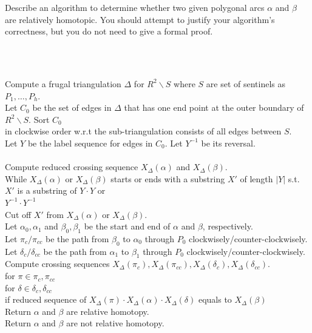 \documentclass[11pt]{article}
\begin{document}
Describe an algorithm to determine whether two given polygonal arcs \(\alpha\) and \(\beta\) are relatively homotopic. You should attempt to justify your algorithm’s correctness, but you do not need to give a formal proof.

\begin{solution}\(\)\par

  \begin{algo}
    \+
    \\  Compute a frugal triangulation \(\Delta\) for \(R^2\backslash S\) where \(S\) are set of sentinels as \(P_1,\dots,P_h\).
    \\  Let \(C_0\) be the set of edges in \(\Delta\) that has one end point at the outer boundary of \(R^2\backslash S\). Sort \(C_0\)
    \\  in clockwise order w.r.t the sub-triangulation consists of all edges between \(S\).
    \\  Let \(Y\) be the label sequence for edges in \(C_0\). Let \(Y^{-1}\) be its reversal.
    \\
    \\  Compute reduced crossing sequence \(X_\Delta(\alpha)\) and \(X_\Delta(\beta)\).
    \\  While \(X_\Delta(\alpha)\) or \(X_\Delta(\beta)\) starts or ends with a substring \(X'\) of length \(|Y|\) s.t. \(X'\) is a substring of \(Y\cdot Y\) or
    \\  \(Y^{-1}\cdot Y^{-1}\)\+
    \\    Cut off \(X'\) from \(X_\Delta(\alpha)\) or \(X_\Delta(\beta)\).\-
    \\  Let \(\alpha_0,\alpha_1\) and \(\beta_0,\beta_1\) be the start and end of \(\alpha\) and \(\beta\), respectively.
    \\  Let \(\pi_c/\pi_{cc}\) be the path from \(\beta_0\) to \(\alpha_0\) through \(P_0\) clockwisely/counter-clockwisely.
    \\  Let \(\delta_c/\delta_{cc}\) be the path from \(\alpha_1\) to \(\beta_1\) through \(P_0\) clockwisely/counter-clockwisely.
    \\  Compute crossing sequences \(X_\Delta(\pi_c),X_\Delta(\pi_{cc}), X_\Delta(\delta_c), X_\Delta(\delta_{cc})\).
    \\  for \(\pi \in {\pi_c,\pi_{cc}}\)\+
    \\      for \(\delta\in {\delta_c,\delta_{cc}}\)\+
    \\          if reduced sequence of \(X_\Delta(\pi)\cdot X_\Delta(\alpha)\cdot X_\Delta(\delta)\) equals to \(X_\Delta(\beta)\)\+
    \\              Return \(\alpha\) and \(\beta\) are relative homotopy.\-\-\-
    \\  Return \(\alpha\) and \(\beta\) are not relative homotopy.
  \end{algo}
\end{solution}
\end{document}
